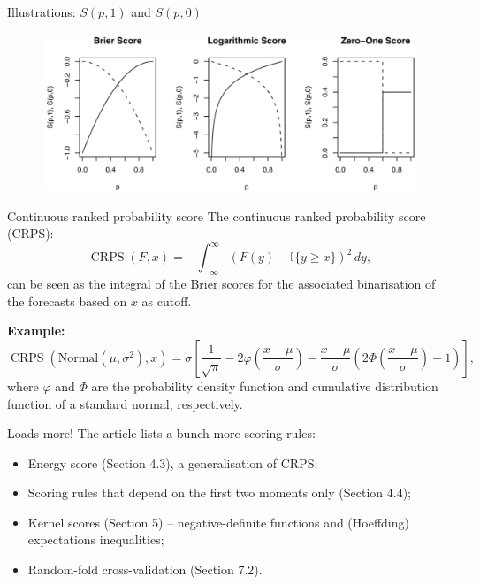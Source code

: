 \begin{frame}{Illustrations: $S(p, 1)$ and $S(p, 0)$}
\begin{figure}
 \begin{center}
  \includegraphics[scale=0.45]{figures/S_of_p.pdf}
 \end{center}
\end{figure}
\end{frame}
\begin{frame}{Continuous ranked probability score}
The continuous ranked probability score (CRPS):
\begin{equation}
 \operatorname{CRPS}(F, x) = -\int_{-\infty}^{\infty} \left( F(y) - \mathbb{I}\{y \geq x\}\right)^2\,dy,
\end{equation}
can be seen as the integral of the Brier scores for the associated binarisation of the forecasts based on $x$ as cutoff.

\textbf{Example:}
\begin{equation*}
 \operatorname{CRPS}\left(\text{Normal}(\mu, \sigma^2), x\right) = \sigma \left[ \frac{1}{\sqrt{\pi}}-2\varphi\left(\frac{x-\mu}{\sigma}\right) - \frac{x-\mu}{\sigma}\left(2\Phi\left(\frac{x-\mu}{\sigma}\right)-1\right) \right],
\end{equation*}
where $\varphi$ and $\Phi$ are the probability density function and cumulative distribution function of a standard normal, respectively.
\end{frame}
\begin{frame}{Loads more!}
The article lists a bunch more scoring rules:
\begin{itemize}
 \item Energy score (Section 4.3), a generalisation of CRPS;
 \item Scoring rules that depend on the first two moments only (Section 4.4);
 \item Kernel scores (Section 5) -- negative-definite functions and (Hoeffding) expectations inequalities;
 \item Random-fold cross-validation (Section 7.2).
\end{itemize}
\end{frame}
